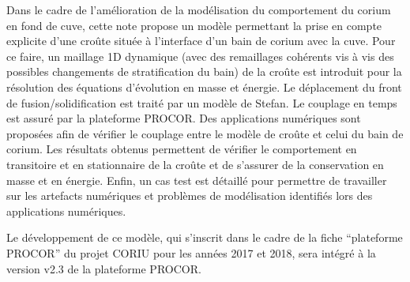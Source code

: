 Dans le cadre de l’amélioration de la modélisation du comportement du corium en fond de cuve, cette note propose un modèle permettant la prise en compte explicite d’une croûte située à l’interface d’un bain de
corium avec la cuve. Pour ce faire, un maillage 1D dynamique (avec des remaillages cohérents vis à vis des possibles changements de stratification du bain) de la croûte est introduit pour la résolution des équations d’évolution en masse et énergie. Le déplacement du front de fusion/solidification est traité par un modèle de Stefan. Le couplage en temps est assuré par la plateforme PROCOR. Des applications numériques sont proposées afin de vérifier le couplage entre le modèle de croûte et celui du bain de corium. Les résultats obtenus permettent de vérifier le comportement en transitoire et en stationnaire de la croûte et de s’assurer de la conservation en masse et en énergie. Enfin, un cas test est détaillé pour permettre de travailler sur les artefacts numériques et problèmes de modélisation identifiés lors des applications numériques.

Le développement de ce modèle, qui s’inscrit dans le cadre de la fiche ``plateforme PROCOR'' du projet CORIU pour les années 2017 et 2018, sera intégré à la version v2.3 de la plateforme PROCOR. 
